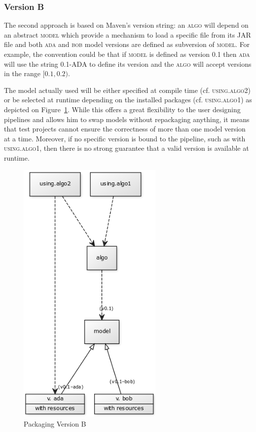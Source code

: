 \documentclass{article}
\newcommand{\ID}[1]{{\textsc{#1}}}
\newcommand{\JAR}{JAR\xspace}
\begin{document}
\subsubsection{Version B}

The second approach is based on Maven's version string: an \ID{algo} will depend on an abstract
\ID{model} which provide a mechanism to load a specific file from its \JAR file and both \ID{ada}
and \ID{bob} model versions are defined as subversion of \ID{model}. For example, the convention
could be that if \ID{model} is defined as version \ID{0.1} then \ID{ada} will use the string
\ID{0.1-ADA} to define its version and the \ID{algo} will accept versions in the range $ [0.1,0.2)
$.

The model actually used will be either specified at compile time (cf. \ID{using.algo2}) or be selected at runtime depending on the installed packages (cf. \ID{using.algo1}) as depicted on Figure~\ref{fig:pkgsysB}. While this offers a great flexibility to the user designing pipelines and allows him to swap models without repackaging anything, it means that test projects cannot ensure the correctness of more than one model version at a time. Moreover, if no specific version is bound to the pipeline, such as with \ID{using.algo1}, then there is no strong guarantee that a valid version is available at runtime.

\begin{figure}
\centering
\includegraphics[width=200pt]{res/packaging_version_B.png}
\caption{Packaging Version B}
\label{fig:pkgsysB}
\end{figure}
\end{document}
